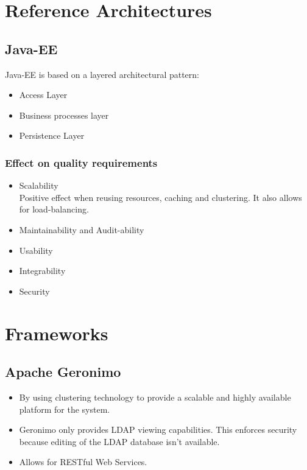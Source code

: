 
\section{Reference Architectures}
	\subsection{Java-EE}
	Java-EE is based on a layered architectural pattern: 
	\begin{itemize}
		\item Access Layer
		\item Business processes layer
		\item Persistence Layer
	\end{itemize}
	\subsubsection{Effect on quality requirements}
	\begin{itemize}
		\item Scalability\\
		Positive effect when reusing resources, caching and clustering. It also allows for load-balancing.
		\item Maintainability and Audit-ability
		
		\item Usability
		\item Integrability  
		\item Security
	\end{itemize}

\section{Frameworks}
	\subsection{Apache Geronimo}
	\begin{itemize}
		\item By using clustering technology to provide a scalable and highly available platform for the system.
		\item Geronimo only provides LDAP viewing capabilities. This enforces security because editing of the LDAP database isn't available.
		\item Allows for RESTful Web Services.
	\end{itemize}